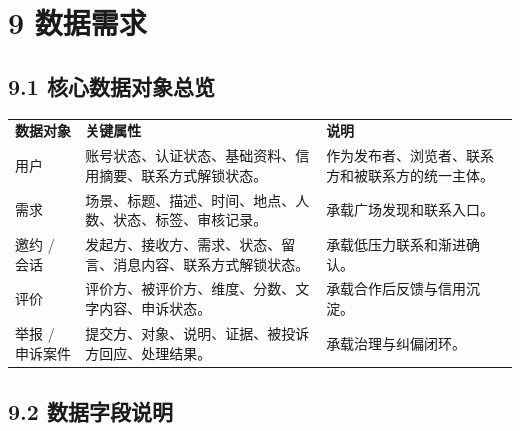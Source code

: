 \chapter{9 数据需求}\label{ux6570ux636eux9700ux6c42}

\section{9.1
核心数据对象总览}\label{ux6838ux5fc3ux6570ux636eux5bf9ux8c61ux603bux89c8}

{\def\LTcaptype{none} %
\begin{xltabular}{\textwidth}{@{}>{\centering\arraybackslash}X>{\centering\arraybackslash}X>{\centering\arraybackslash}X@{}}
\toprule\noalign{}
\endhead
\bottomrule\noalign{}
\endlastfoot
\textbf{数据对象} & \textbf{关键属性} & \textbf{说明} \\
用户 & 账号状态、认证状态、基础资料、信用摘要、联系方式解锁状态。 &
作为发布者、浏览者、联系方和被联系方的统一主体。 \\
需求 & 场景、标题、描述、时间、地点、人数、状态、标签、审核记录。 &
承载广场发现和联系入口。 \\
邀约 / 会话 &
发起方、接收方、需求、状态、留言、消息内容、联系方式解锁状态。 &
承载低压力联系和渐进确认。 \\
评价 & 评价方、被评价方、维度、分数、文字内容、申诉状态。 &
承载合作后反馈与信用沉淀。 \\
举报 / 申诉案件 & 提交方、对象、说明、证据、被投诉方回应、处理结果。 &
承载治理与纠偏闭环。 \\
\end{xltabular}
}


\section{9.2
数据字段说明}\label{ux6570ux636eux5b57ux6bb5ux8bf4ux660e}

